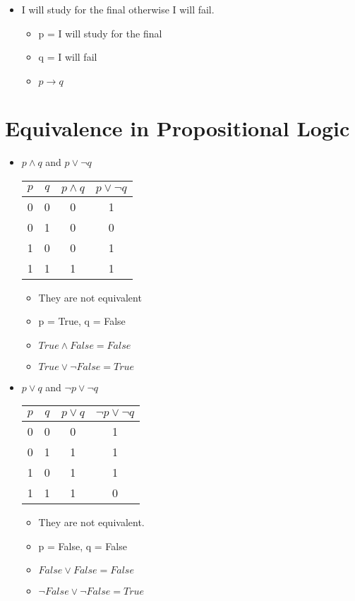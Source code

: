 \documentclass{article}
\begin{document}
\begin{itemize}
    \item I will study for the final otherwise I will fail.
\begin{itemize}
    \item p = I will study for the final 
    \item q = I will fail
    \item $p \to q$
\end{itemize}
\end{itemize}
 

\section*{Equivalence in Propositional Logic}

\begin{itemize}
    \item $p \land q $ and $p \lor \lnot q$

\begin{tabular}{|c|c|c|c|}
\hline
$p$ & $q$ & $p \land q$ & $p \lor  \lnot q$ \\
\hline
0 & 0 & 0 & 1 \\
0 & 1 & 0 & 0 \\
1 & 0 & 0 & 1 \\
1 & 1 & 1 & 1 \\
\hline
\end{tabular}
\begin{itemize}
    \item They are not equivalent 
    \item p = True, q = False
    \item $True \land False = False$ 
    \item $True \lor \lnot False = True$
\end{itemize}
\end{itemize}



\begin{itemize}
    \item $p \lor q $ and $\lnot p \lor \lnot q$

\begin{tabular}{|c|c|c|c|}
\hline
$p$ & $q$ & $p \lor q$ & $ \lnot p \lor  \lnot q$ \\
\hline
0 & 0 & 0 & 1 \\
0 & 1 & 1 & 1 \\
1 & 0 & 1 & 1 \\
1 & 1 & 1 & 0 \\
\hline
\end{tabular}
\begin{itemize}
    \item They are not equivalent.
    \item p = False, q = False
    \item $False \lor False = False$ 
    \item $\lnot False \lor \lnot False = True$
\end{itemize}
\end{itemize}
\end{document}
